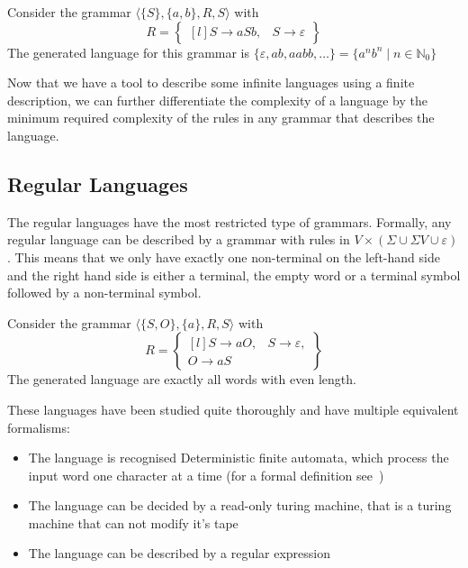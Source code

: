 \begin{exmp}
    Consider the grammar $\langle \{S\}, \{a, b\}, R, S \rangle$ with
    \[
        R = \begin{Bmatrix*}[l]
                S \to aSb,
                &S \to \varepsilon
        \end{Bmatrix*}
    \]
    The generated language for this grammar is $\{\varepsilon, ab, aabb, \dots\} = \{a^{n}b^{n} \mid n \in \mathbb{N}_0\}$
\end{exmp}

Now that we have a tool to describe some infinite languages using a finite description, we can further differentiate the complexity of a language by the minimum required complexity of the rules in any grammar that describes the language.

\subsection{Regular Languages}\label{subsec:regular-languages}

The regular languages have the most restricted type of grammars.
Formally, any regular language can be described by a grammar with rules in $V\times(\Sigma \cup \Sigma V \cup \varepsilon)$.
This means that we only have exactly one non-terminal on the left-hand side and the right hand side is either a terminal, the empty word or a terminal symbol followed by a non-terminal symbol.

\begin{exmp}
    Consider the grammar $\langle \{S, O\}, \{a\}, R, S \rangle$ with
    \[
        R = \begin{Bmatrix*}[l]
                S \to aO,
                &S \to \varepsilon, \\
                O \to aS
        \end{Bmatrix*}
    \]
    The generated language are exactly all words with even length.
\end{exmp}

These languages have been studied quite thoroughly and have multiple equivalent formalisms:
\begin{itemize}
    \setlength\itemsep{0.2em}
    \item The language is recognised Deterministic finite automata, which process the input word one character at a time (for a formal definition see~\cite{theory-cs})
    \item The language can be decided by a read-only turing machine, that is a turing machine that can not modify it's tape
    \item The language can be described by a regular expression
\end{itemize}

